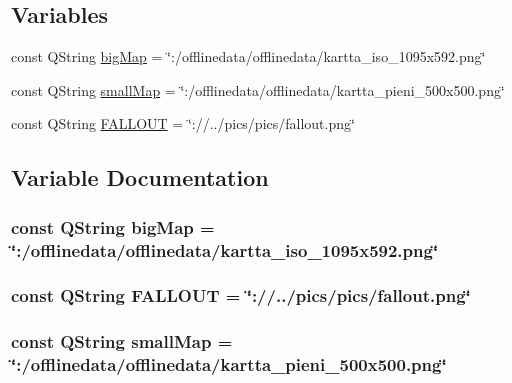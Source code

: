 \subsection*{Variables}
\begin{DoxyCompactItemize}
\item 
const Q\-String \hyperlink{gameengine_8hh_ad6494001dd20d6bedc7543fec6c695ba}{big\-Map} = \char`\"{}\-:/offlinedata/offlinedata/kartta\-\_\-iso\-\_\-1095x592.\-png\char`\"{}
\item 
const Q\-String \hyperlink{gameengine_8hh_af60fadacdd8d88e839ee0eae05d28518}{small\-Map} = \char`\"{}\-:/offlinedata/offlinedata/kartta\-\_\-pieni\-\_\-500x500.\-png\char`\"{}
\item 
const Q\-String \hyperlink{gameengine_8hh_aa00341459be5e91d4cfc88f9c6e60e1b}{F\-A\-L\-L\-O\-U\-T} = \char`\"{}\-://../pics/pics/fallout.\-png\char`\"{}
\end{DoxyCompactItemize}


\subsection{Variable Documentation}
\hypertarget{gameengine_8hh_ad6494001dd20d6bedc7543fec6c695ba}{
\subsubsection[{big\-Map}]{\setlength{\rightskip}{0pt plus 5cm}const Q\-String big\-Map = \char`\"{}\-:/offlinedata/offlinedata/kartta\-\_\-iso\-\_\-1095x592.\-png\char`\"{}}}\label{gameengine_8hh_ad6494001dd20d6bedc7543fec6c695ba}
\hypertarget{gameengine_8hh_aa00341459be5e91d4cfc88f9c6e60e1b}{
\subsubsection[{F\-A\-L\-L\-O\-U\-T}]{\setlength{\rightskip}{0pt plus 5cm}const Q\-String F\-A\-L\-L\-O\-U\-T = \char`\"{}\-://../pics/pics/fallout.\-png\char`\"{}}}\label{gameengine_8hh_aa00341459be5e91d4cfc88f9c6e60e1b}
\hypertarget{gameengine_8hh_af60fadacdd8d88e839ee0eae05d28518}{
\subsubsection[{small\-Map}]{\setlength{\rightskip}{0pt plus 5cm}const Q\-String small\-Map = \char`\"{}\-:/offlinedata/offlinedata/kartta\-\_\-pieni\-\_\-500x500.\-png\char`\"{}}}\label{gameengine_8hh_af60fadacdd8d88e839ee0eae05d28518}
